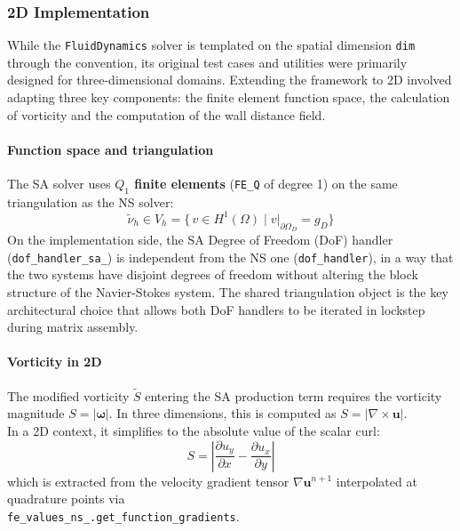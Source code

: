 
\subsubsection{2D Implementation}
\label{sec:02_2d_imp}

While the \textbf{\lifex} \texttt{FluidDynamics} solver is templated on the spatial dimension \texttt{dim} through the \dealii convention, its original test cases and utilities were primarily designed for three-dimensional domains. Extending the framework to 2D involved adapting three key components: the finite element function space, the calculation of vorticity and the computation of the wall distance field.

\paragraph{Function space and triangulation}

The SA solver uses \textbf{$Q_1$ finite elements} (\texttt{FE\_Q} of degree 1)
on the same triangulation as the NS solver:
\begin{equation}
  \tilde{\nu}_h \in V_h
  = \bigl\{\,v \in H^1(\Omega) \;\big|\; v\big|_{\partial\Omega_D} = g_D\bigr\}
\end{equation}
On the implementation side, the SA Degree of Freedom (DoF) handler (\texttt{dof\_handler\_sa\_}) is independent from the NS one (\texttt{dof\_handler}), in a way that the two systems have disjoint degrees of freedom without altering the block structure of the Navier-Stokes system. The shared triangulation object is the key architectural choice that allows both DoF handlers to be iterated in lockstep during matrix assembly.

\paragraph{Vorticity in 2D}

The modified vorticity $\tilde{S}$ entering the SA production term requires
the vorticity magnitude $S = |\boldsymbol{\omega}|$. In three dimensions, this is computed as $S = |\nabla \times \mathbf{u}|$.\\

In a 2D context, it simplifies to the absolute value of the scalar curl:
\begin{equation}
  S = \left|\frac{\partial u_y}{\partial x} - \frac{\partial u_x}{\partial y}\right|
\end{equation}
which is extracted from the velocity gradient tensor $\nabla \mathbf{u}^{n+1}$ interpolated at quadrature points via\\ \texttt{fe\_values\_ns\_.get\_function\_gradients}.

